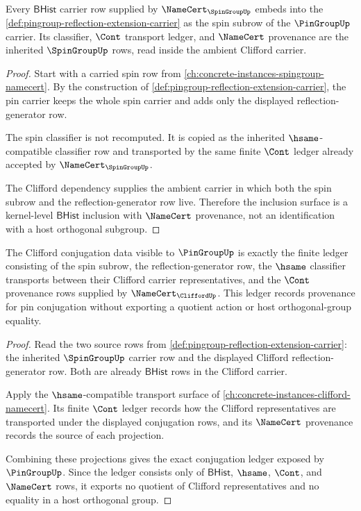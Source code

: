 \begin{theorem}
\label{thm:pingroup-spingroup-inclusion-surface}
Every $\mathsf{BHist}$ carrier row supplied by
$\NameCert_{\SpinGroupUp}$ embeds into the
\autoref{def:pingroup-reflection-extension-carrier} as the spin subrow of the
$\PinGroupUp$ carrier.  Its classifier, $\Cont$ transport ledger, and
$\NameCert$ provenance are the inherited $\SpinGroupUp$ rows, read inside the
ambient Clifford carrier.
\end{theorem}
\begin{proof}
Start with a carried spin row from
\autoref{ch:concrete-instances-spingroup-namecert}.  By the construction of
\autoref{def:pingroup-reflection-extension-carrier}, the pin carrier keeps the
whole spin carrier and adds only the displayed reflection-generator row.

The spin classifier is not recomputed.  It is copied as the inherited
$\hsame$-compatible classifier row and transported by the same finite $\Cont$
ledger already accepted by $\NameCert_{\SpinGroupUp}$.

The Clifford dependency supplies the ambient carrier in which both the spin
subrow and the reflection-generator row live.  Therefore the inclusion surface
is a kernel-level $\mathsf{BHist}$ inclusion with $\NameCert$ provenance, not an
identification with a host orthogonal subgroup.
\end{proof}

\begin{theorem}
\label{thm:pingroup-clifford-conjugation-ledger}
The Clifford conjugation data visible to $\PinGroupUp$ is exactly the finite
ledger consisting of the spin subrow, the reflection-generator row, the
$\hsame$ classifier transports between their Clifford carrier representatives,
and the $\Cont$ provenance rows supplied by
$\NameCert_{\CliffordUp}$.  This ledger records provenance for pin conjugation
without exporting a quotient action or host orthogonal-group equality.
\end{theorem}
\begin{proof}
Read the two source rows from
\autoref{def:pingroup-reflection-extension-carrier}: the inherited
$\SpinGroupUp$ carrier row and the displayed Clifford reflection-generator row.
Both are already $\mathsf{BHist}$ rows in the Clifford carrier.

Apply the $\hsame$-compatible transport surface of
\autoref{ch:concrete-instances-clifford-namecert}.  Its finite $\Cont$ ledger
records how the Clifford representatives are transported under the displayed
conjugation rows, and its $\NameCert$ provenance records the source of each
projection.

Combining these projections gives the exact conjugation ledger exposed by
$\PinGroupUp$.  Since the ledger consists only of $\mathsf{BHist}$,
$\hsame$, $\Cont$, and $\NameCert$ rows, it exports no quotient of Clifford
representatives and no equality in a host orthogonal group.
\end{proof}

